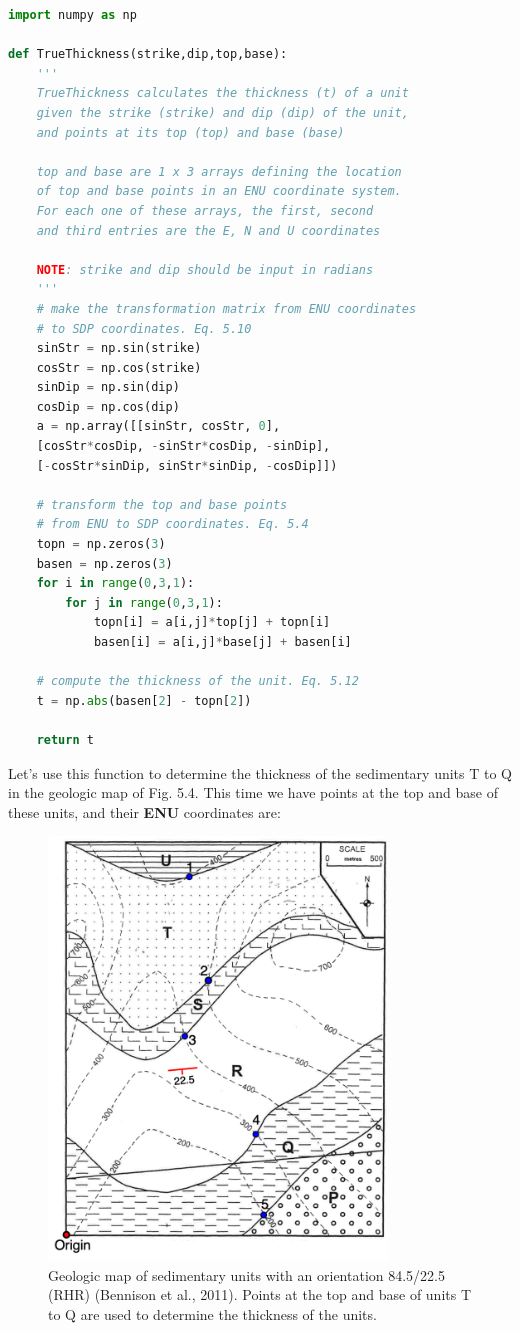 \documentclass[a4paper , 12pt]{book}
\begin{document}
\begin{lstlisting}[language=Python, frame=single]
import numpy as np

def TrueThickness(strike,dip,top,base):
    '''
    TrueThickness calculates the thickness (t) of a unit 
    given the strike (strike) and dip (dip) of the unit, 
    and points at its top (top) and base (base) 

    top and base are 1 x 3 arrays defining the location 
    of top and base points in an ENU coordinate system. 
    For each one of these arrays, the first, second
    and third entries are the E, N and U coordinates

    NOTE: strike and dip should be input in radians
    '''
    # make the transformation matrix from ENU coordinates 
    # to SDP coordinates. Eq. 5.10
    sinStr = np.sin(strike)
    cosStr = np.cos(strike)
    sinDip = np.sin(dip)
    cosDip = np.cos(dip)
    a = np.array([[sinStr, cosStr, 0],
    [cosStr*cosDip, -sinStr*cosDip, -sinDip],
    [-cosStr*sinDip, sinStr*sinDip, -cosDip]])
    
    # transform the top and base points 
    # from ENU to SDP coordinates. Eq. 5.4 
    topn = np.zeros(3)
    basen = np.zeros(3)
    for i in range(0,3,1):
        for j in range(0,3,1):
            topn[i] = a[i,j]*top[j] + topn[i]
            basen[i] = a[i,j]*base[j] + basen[i]
    
    # compute the thickness of the unit. Eq. 5.12
    t = np.abs(basen[2] - topn[2])
    
    return t
\end{lstlisting}
 
Let's use this function to determine the thickness of the sedimentary units T to Q in the geologic map of Fig. 5.4. This time we have points at the top and base of these units, and their \textbf{ENU} coordinates are:

 \begin{figure}[H]
    \centering
    \includegraphics[width=9cm]{Figures/ch5f4.png}
    \caption{Geologic map of sedimentary units with an orientation 84.5/22.5 (RHR) (Bennison et al.,  2011). Points at the top and base of units T to Q are used to determine the thickness of the units.}
\end{figure}
\end{document}
